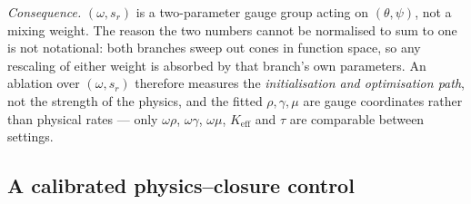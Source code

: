 \emph{Consequence.} $(\omega,s_{r})$ is a two-parameter gauge group acting on
$(\theta,\psi)$, not a mixing weight. The reason the two numbers cannot be
normalised to sum to one is not notational: both branches sweep out cones in
function space, so any rescaling of either weight is absorbed by that branch's
own parameters. An ablation over $(\omega,s_{r})$ therefore measures the
\emph{initialisation and optimisation path}, not the strength of the physics,
and the fitted $\rho,\gamma,\mu$ are gauge coordinates rather than physical
rates --- only $\omega\rho$, $\omega\gamma$, $\omega\mu$, $K_{\mathrm{eff}}$ and
$\tau$ are comparable between settings.

\subsection{A calibrated physics--closure control}
\label{sec:convex}

